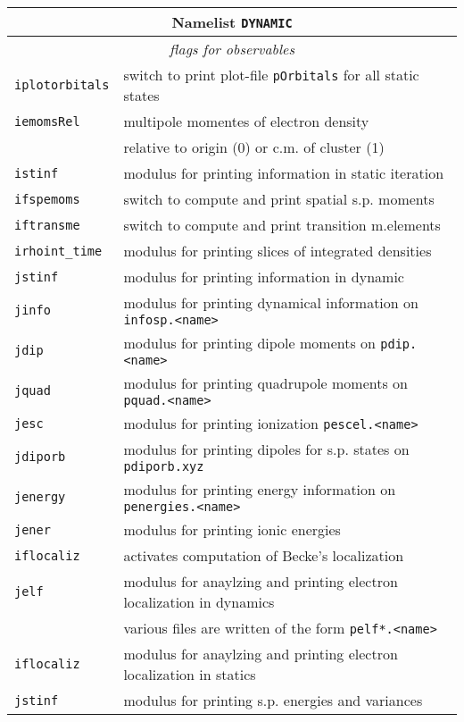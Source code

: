 \documentclass[12pt]{article}
\begin{document}
\begin{tabular}{ll}
\hline
\multicolumn{2}{c}{Namelist {\tt DYNAMIC}} in {\tt for005.<name>} \\
\hline
\multicolumn{2}{c}{\it flags for observables} \\
\hline
{\tt iplotorbitals} & switch to print plot-file {\tt pOrbitals} for
all static states \\
{\tt iemomsRel        }& multipole momentes of electron density \\
{\tt                  }& relative to origin (0) or c.m. of cluster (1)\\
{\tt istinf           }& modulus for printing information in static iteration \\
{\tt ifspemoms        }& switch to compute and print spatial s.p. moments\\
{\tt iftransme        }& switch to compute and print transition m.elements\\
{\tt irhoint\_time   }& modulus for printing slices of integrated densities\\
{\tt jstinf           }& modulus for printing information in dynamic \\
{\tt jinfo            }& modulus for printing dynamical information on {\tt
  infosp.<name>} \\
{\tt jdip             }& modulus for printing dipole moments on {\tt pdip.<name>}\\
{\tt jquad            }& modulus for printing quadrupole moments on {\tt pquad.<name>}\\
{\tt jesc            }& modulus for printing ionization {\tt pescel.<name>}\\
{\tt jdiporb} & modulus for printing dipoles for s.p. states on {\tt pdiporb.xyz} \\
{\tt jenergy          }& modulus for printing energy information on {\tt penergies.<name>} \\
{\tt jener} &  modulus for printing ionic energies\\
{\tt iflocaliz}        & activates computation of Becke's localization
\\
{\tt jelf}             & modulus for anaylzing and printing electron
localization in dynamics
\\
 & various files are written of the form {\tt pelf*.<name>}
\\
{\tt iflocaliz}             & modulus for anaylzing and printing electron
localization in statics
\\
{\tt jstinf}           & modulus for printing s.p. energies and variances

\end{tabular}
\end{document}
